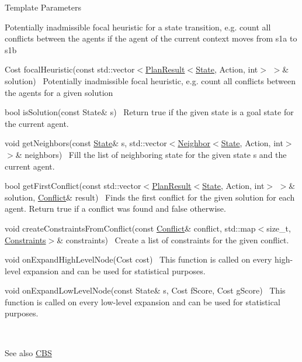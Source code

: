 \begin{DoxyTemplParams}{Template Parameters}
\begin{DoxyItemize}
 Potentially inadmissible focal heuristic for a state transition, e.\+g. count all conflicts between the agents if the agent of the current context moves from s1a to s1b
\item {\ttfamily Cost focal\+Heuristic(const std\+::vector$<$\hyperlink{structlib_multi_robot_planning_1_1_plan_result}{Plan\+Result}$<$\hyperlink{structlib_multi_robot_planning_1_1_state}{State}, Action, int$>$ $>$\& solution)}~\newline
 Potentially inadmissible focal heuristic, e.\+g. count all conflicts between the agents for a given solution
\item {\ttfamily bool is\+Solution(const State\& s)}~\newline
 Return true if the given state is a goal state for the current agent.
\item {\ttfamily void get\+Neighbors(const \hyperlink{structlib_multi_robot_planning_1_1_state}{State}\& s, std\+::vector$<$\hyperlink{structlib_multi_robot_planning_1_1_neighbor}{Neighbor}$<$\hyperlink{structlib_multi_robot_planning_1_1_state}{State}, Action, int$>$ $>$\& neighbors)}~\newline
 Fill the list of neighboring state for the given state s and the current agent.
\item {\ttfamily bool get\+First\+Conflict(const std\+::vector$<$\hyperlink{structlib_multi_robot_planning_1_1_plan_result}{Plan\+Result}$<$\hyperlink{structlib_multi_robot_planning_1_1_state}{State}, Action, int$>$ $>$\& solution, \hyperlink{structlib_multi_robot_planning_1_1_conflict}{Conflict}\& result)}~\newline
 Finds the first conflict for the given solution for each agent. Return true if a conflict was found and false otherwise.
\item {\ttfamily void create\+Constraints\+From\+Conflict(const \hyperlink{structlib_multi_robot_planning_1_1_conflict}{Conflict}\& conflict, std\+::map$<$size\+\_\+t, \hyperlink{structlib_multi_robot_planning_1_1_constraints}{Constraints}$>$\& constraints)}~\newline
 Create a list of constraints for the given conflict.
\item {\ttfamily void on\+Expand\+High\+Level\+Node(\+Cost cost)}~\newline
 This function is called on every high-\/level expansion and can be used for statistical purposes.
\item {\ttfamily void on\+Expand\+Low\+Level\+Node(const State\& s, Cost f\+Score, Cost g\+Score)}~\newline
 This function is called on every low-\/level expansion and can be used for statistical purposes.
\end{DoxyItemize}\\
\hline
\end{DoxyTemplParams}
\begin{DoxySeeAlso}{See also}
\hyperlink{classlib_multi_robot_planning_1_1_c_b_s}{C\+BS} 
\end{DoxySeeAlso}


